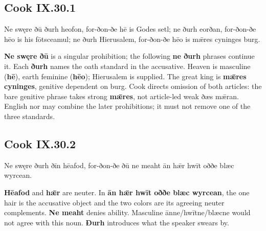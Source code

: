 \subsection*{Cook IX.30.1}

\par\begin{minipage}{\linewidth}\raggedright
Ne swęre ðū ðurh heofon, for-ðon-ðe hē is Godes setl; ne ðurh eorðan, for-ðon-ðe hēo is his fōtsceamul; ne ðurh Hierusalem, for-ðon-ðe hēo is mǣres cyninges burg.

\textbf{Ne swęre ðū} is a singular prohibition; the following \textbf{ne ðurh} phrases continue it. Each \textbf{ðurh} names the oath standard in the accusative. Heaven is masculine (\textbf{hē}), earth feminine (\textbf{hēo}); Hierusalem is supplied. The great king is \textbf{mǣres cyninges}, genitive dependent on burg. Cook directs omission of both articles: the bare genitive phrase takes strong \textbf{mǣres}, not article-led weak ðæs mǣran. English nor may combine the later prohibitions; it must not remove one of the three standards.

\end{minipage}\par\addvspace{4pt}

\subsection*{Cook IX.30.2}

\par\begin{minipage}{\linewidth}\raggedright
Ne swęre ðurh ðīn hēafod, for-ðon-ðe ðū ne meaht ān hǣr hwīt oððe blæc wyrcean.

\textbf{Hēafod} and \textbf{hǣr} are neuter. In \textbf{ān hǣr hwīt oððe blæc wyrcean}, the one hair is the accusative object and the two colors are its agreeing neuter complements. \textbf{Ne meaht} denies ability. Masculine ānne/\allowbreak{}hwītne/\allowbreak{}blæcne would not agree with this noun. \textbf{Ðurh} introduces what the speaker swears by.

\end{minipage}\par\addvspace{4pt}

